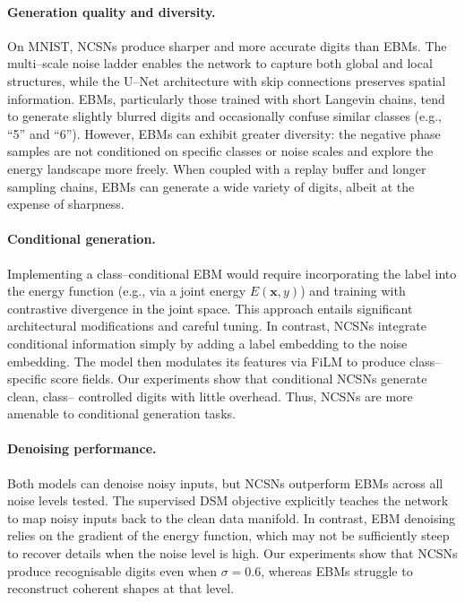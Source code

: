 \paragraph{Generation quality and diversity.}
On MNIST, NCSNs produce sharper and more accurate digits than EBMs.
The multi–scale noise ladder enables the network to capture both global
and local structures, while the U–Net architecture with skip connections
preserves spatial information.  EBMs, particularly those trained with
short Langevin chains, tend to generate slightly blurred digits and
occasionally confuse similar classes (e.g., ``5'' and ``6'').  However,
EBMs can exhibit greater diversity: the negative phase samples are not
conditioned on specific classes or noise scales and explore the energy
landscape more freely.  When coupled with a replay buffer and longer
sampling chains, EBMs can generate a wide variety of digits, albeit at
the expense of sharpness.

\paragraph{Conditional generation.}
Implementing a class–conditional EBM would require incorporating the
label into the energy function (e.g., via a joint energy $E(\mathbf{x},y)$)
and training with contrastive divergence in the joint space.  This
approach entails significant architectural modifications and careful
tuning.  In contrast, NCSNs integrate conditional information simply by
adding a label embedding to the noise embedding.  The model then
modulates its features via FiLM to produce class–specific score fields.
Our experiments show that conditional NCSNs generate clean, class–
controlled digits with little overhead.  Thus, NCSNs are more amenable to
conditional generation tasks.

\paragraph{Denoising performance.}
Both models can denoise noisy inputs, but NCSNs outperform EBMs across
all noise levels tested.  The supervised DSM objective explicitly
teaches the network to map noisy inputs back to the clean data manifold.
In contrast, EBM denoising relies on the gradient of the energy function,
which may not be sufficiently steep to recover details when the noise
level is high.  Our experiments show that NCSNs produce recognisable
digits even when $\sigma=0.6$, whereas EBMs struggle to reconstruct
coherent shapes at that level.

